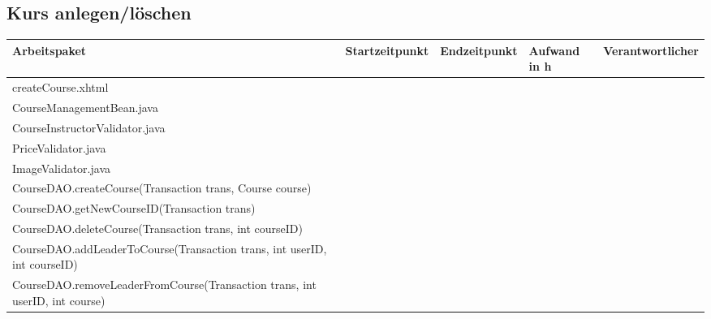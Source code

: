 \begin{landscape}
	
	
	\subsection{Kurs anlegen/löschen}
	\begin{tabular}{|p{10cm}|p{4cm}|p{3cm}|p{3cm}|p{3cm}|}
		\hline  \textbf{Arbeitspaket} & \textbf{Startzeitpunkt} & \textbf{Endzeitpunkt} & \textbf{Aufwand in h} & \textbf{Verantwortlicher} \\ 
		\hline   createCourse.xhtml                                    &                            &                             &                     &\\
		\hline   CourseManagementBean.java                             &                            &                             &                     &\\
		\hline   CourseInstructorValidator.java                        &                            &                             &                     &\\
		\hline   PriceValidator.java                             &                            &                             &                     &\\
		\hline   ImageValidator.java                             &                            &                             &                     &\\
		\hline   CourseDAO.createCourse(Transaction trans, Course course)    &                            &                             &                     &\\
		\hline   CourseDAO.getNewCourseID(Transaction trans)                 &                            &                             &                     &\\
		\hline   CourseDAO.deleteCourse(Transaction trans, int courseID)     &                            &                             &                     &\\
		\hline   CourseDAO.addLeaderToCourse(Transaction trans, int userID, int courseID)    &                            &                             &                     &\\
		\hline   CourseDAO.removeLeaderFromCourse(Transaction trans, int userID, int course) &                            &                             &                     &\\
		\hline 
	\end{tabular} \ \\
	\ \\
	

\end{landscape}
